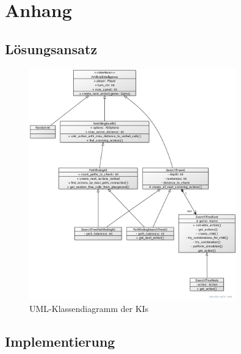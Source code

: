\chapter{Anhang}
\label{ch:anhang}

\section{Lösungsansatz}
\label{sec:anhang-loesungsansatz}

\begin{figure}[htb]
\centering
\includegraphics[width=0.8\textwidth]{Bilder/Klassendiagramm_AIs.png}
\caption{UML-Klassendiagramm der \ac{KI}s}
\label{fig:klassendiagramm-AIs}
\end{figure}

\section{Implementierung}
\label{sec:anhang-implementierung}

